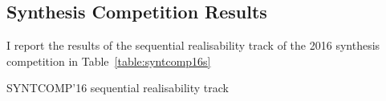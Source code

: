 
\subsection{Synthesis Competition Results}

I report the results of the sequential realisability track of the 2016 synthesis competition in Table~\ref{table:syntcomp16s}

\begin{table}

    \caption{SYNTCOMP'16 sequential realisability track}
    \label{table:syntcomp16s}
\end{table}


